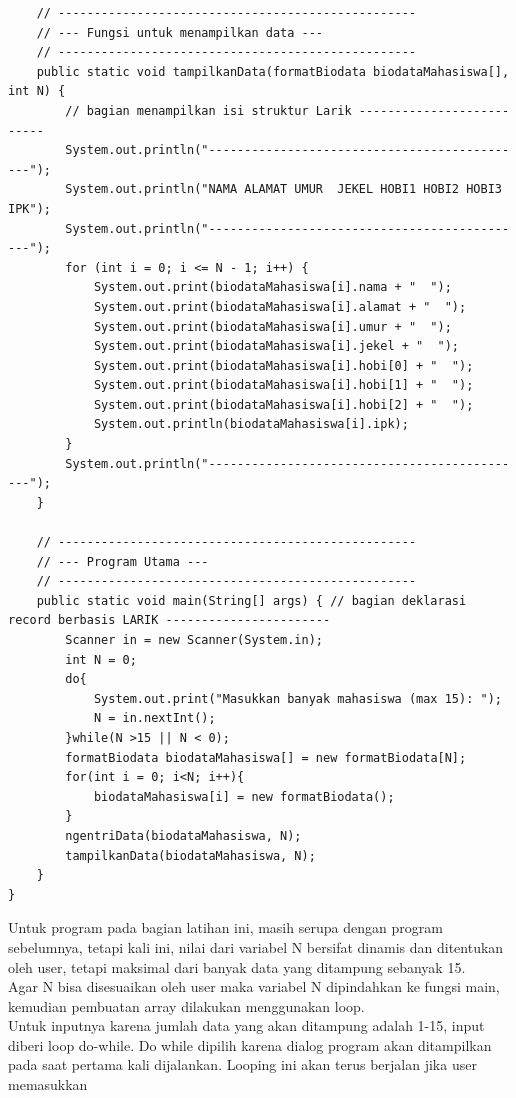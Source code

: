\documentclass[a4paper,12pt]{article}
\begin{document}
\begin{lstlisting}
    // --------------------------------------------------
    // --- Fungsi untuk menampilkan data ---
    // --------------------------------------------------
    public static void tampilkanData(formatBiodata biodataMahasiswa[], int N) {
        // bagian menampilkan isi struktur Larik --------------------------
        System.out.println("---------------------------------------------");
        System.out.println("NAMA ALAMAT UMUR  JEKEL HOBI1 HOBI2 HOBI3 IPK");
        System.out.println("---------------------------------------------");
        for (int i = 0; i <= N - 1; i++) {
            System.out.print(biodataMahasiswa[i].nama + "  ");
            System.out.print(biodataMahasiswa[i].alamat + "  ");
            System.out.print(biodataMahasiswa[i].umur + "  ");
            System.out.print(biodataMahasiswa[i].jekel + "  ");
            System.out.print(biodataMahasiswa[i].hobi[0] + "  ");
            System.out.print(biodataMahasiswa[i].hobi[1] + "  ");
            System.out.print(biodataMahasiswa[i].hobi[2] + "  ");
            System.out.println(biodataMahasiswa[i].ipk);
        }
        System.out.println("---------------------------------------------");
    }

    // --------------------------------------------------
    // --- Program Utama ---
    // --------------------------------------------------
    public static void main(String[] args) { // bagian deklarasi record berbasis LARIK -----------------------
        Scanner in = new Scanner(System.in);
        int N = 0;
        do{
            System.out.print("Masukkan banyak mahasiswa (max 15): ");
            N = in.nextInt();
        }while(N >15 || N < 0);
        formatBiodata biodataMahasiswa[] = new formatBiodata[N];
        for(int i = 0; i<N; i++){
            biodataMahasiswa[i] = new formatBiodata();
        }
        ngentriData(biodataMahasiswa, N);
        tampilkanData(biodataMahasiswa, N);
    }
}
\end{lstlisting}
Untuk program pada bagian latihan ini, masih serupa dengan program sebelumnya, tetapi kali ini, nilai dari
variabel N bersifat dinamis dan ditentukan oleh user, tetapi maksimal dari banyak data yang ditampung sebanyak 15.\\
Agar N bisa disesuaikan oleh user maka variabel N dipindahkan ke fungsi main, kemudian pembuatan array dilakukan
menggunakan loop.\\
Untuk inputnya karena jumlah data yang akan ditampung adalah 1-15, input diberi loop do-while. Do while dipilih karena
dialog program akan ditampilkan pada saat pertama kali dijalankan. Looping ini akan terus berjalan jika user memasukkan
\end{document}
